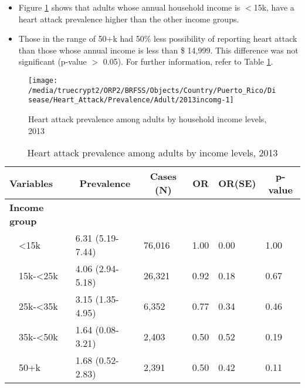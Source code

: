  
 
 \newpage
\begin{itemize}

\item Figure \ref{fig:income.Heart_Attack.2013} shows that adults whose annual household income is 
$<$15k, have a heart attack prevalence higher than the other income groups.

\item Those in the range of 50+k had 50\% less possibility of reporting heart attack than those whose annual income is less than \$ 14,999. This difference was not significant (p-value $>$ 0.05).  For further information, refer to Table \ref{tab:income.Heart_Attack.2013}.

\end{itemize}

\begin{figure}[H]
\caption{Heart attack prevalence among adults by household income levels, 
         2013}
\begin{knitrout}
\color{fgcolor}

{\centering \texttt{[image: /media/truecrypt2/ORP2/BRFSS/Objects/Country/Puerto\_Rico/Disease/Heart\_Attack/Prevalence/Adult/2013incomg-1]} 

}



\end{knitrout}
 \label{fig:income.Heart_Attack.2013}
\end{figure}

\begin{table}[H]
\caption{Heart attack prevalence  among adults by income levels, 2013\label{tab:income.Heart_Attack.2013}} 
\begin{center}
\begin{tabular}{llllll}
\hline\hline
\multicolumn{1}{l}{Variables}&\multicolumn{1}{c}{Prevalence}&\multicolumn{1}{c}{Cases (N)}&\multicolumn{1}{c}{OR}&\multicolumn{1}{c}{OR(SE)}&\multicolumn{1}{c}{p-value}\tabularnewline
\hline
{\bfseries Income group}&&&&&\tabularnewline
~~\textless15k&6.31 (5.19-7.44)&76,016&1.00&0.00&1.00\tabularnewline
~~15k-\textless25k&4.06 (2.94-5.18)&26,321&0.92&0.18&0.67\tabularnewline
~~25k-\textless35k&3.15 (1.35-4.95)& 6,352&0.77&0.34&0.46\tabularnewline
~~35k-\textless50k&1.64 (0.08-3.21)& 2,403&0.50&0.52&0.19\tabularnewline
~~50+k&1.68 (0.52-2.83)& 2,391&0.50&0.42&0.11\tabularnewline
\hline
\end{tabular}\end{center}

\end{table}

